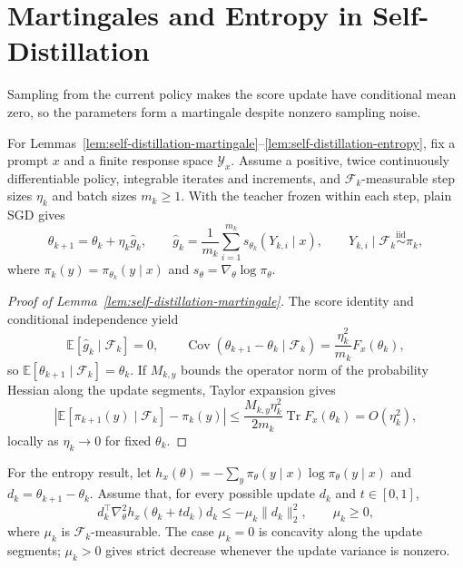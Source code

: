 \section{Martingales and Entropy in Self-Distillation}
\label{app:variance-accumulation}

\begin{insight}
Sampling from the current policy makes the score update have conditional
mean zero, so the parameters form a martingale despite nonzero sampling noise.
\end{insight}

For Lemmas~\ref{lem:self-distillation-martingale}--\ref{lem:self-distillation-entropy}, fix a prompt $x$ and a
finite response space $\mathcal Y_x$. Assume a positive, twice continuously
differentiable policy, integrable iterates and increments, and
$\mathcal F_k$-measurable step sizes $\eta_k$ and batch sizes $m_k\ge1$.
With the teacher frozen within each step, plain SGD gives
\begin{equation}
 \theta_{k+1}=\theta_k+\eta_k\widehat g_k,
 \qquad
 \widehat g_k=\frac1{m_k}\sum_{i=1}^{m_k}s_{\theta_k}(Y_{k,i}\mid x),
 \qquad Y_{k,i}\mid\mathcal F_k
     \overset{\mathrm{iid}}{\sim}\pi_k,
 \label{eq:self-distillation-sgd}
\end{equation}
where $\pi_k(y)=\pi_{\theta_k}(y\mid x)$ and
$s_\theta=\nabla_\theta\log\pi_\theta$.

\begin{proof}[Proof of Lemma~\ref{lem:self-distillation-martingale}]
The score identity and conditional independence yield
\begin{equation}
 \mathbb E[\widehat g_k\mid\mathcal F_k]=0,
 \qquad
 \operatorname{Cov}(\theta_{k+1}-\theta_k\mid\mathcal F_k)
 =\frac{\eta_k^2}{m_k}F_x(\theta_k),
 \label{eq:self-distillation-sgd-covariance}
\end{equation}
so $\mathbb E[\theta_{k+1}\mid\mathcal F_k]=\theta_k$.
If $M_{k,y}$ bounds the operator norm of the probability Hessian along the update segments,
Taylor expansion gives
\begin{equation}
 \left|\mathbb E[\pi_{k+1}(y)\mid\mathcal F_k]-\pi_k(y)\right|
 \le \frac{M_{k,y}\eta_k^2}{2m_k}\operatorname{Tr}F_x(\theta_k)
 =O(\eta_k^2),
 \label{eq:self-distillation-probability-remainder}
\end{equation}
locally as $\eta_k\to0$ for fixed $\theta_k$.
\end{proof}

For the entropy result, let $h_x(\theta)=-\sum_y\pi_\theta(y\mid x)
\log\pi_\theta(y\mid x)$ and $d_k=\theta_{k+1}-\theta_k$.
Assume that, for every possible update $d_k$ and $t\in[0,1]$,
\begin{equation}
 d_k^\top\nabla_\theta^2h_x(\theta_k+t d_k)d_k
 \le-\mu_k\|d_k\|_2^2,
 \qquad \mu_k\ge0,
 \label{eq:self-distillation-entropy-curvature}
\end{equation}
where $\mu_k$ is $\mathcal F_k$-measurable. The case $\mu_k=0$
is concavity along the update segments; $\mu_k>0$ gives strict decrease
whenever the update variance is nonzero.

